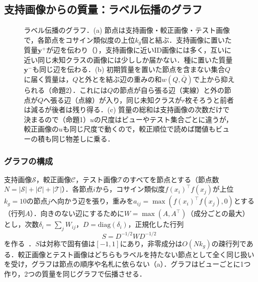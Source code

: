 \subsection{支持画像からの質量：ラベル伝播のグラフ}
\label{sec:graph}
\begin{figure}[t]
\centering
\scalebox{0.77}{}
\caption{ラベル伝播のグラフ．(a) 節点は支持画像・較正画像・テスト画像で，各節点をコサイン類似度の上位$k_g$個と結ぶ．支持画像に置いた質量$\mathbf{y}^{+}$が辺を伝わり（），支持画像に近いID画像には多く，互いに近い同じ未知クラスの画像には少ししか届かない．種に置いた質量$\mathbf{y}^{-}$も同じ辺を伝わる．(b) 初期質量を置いた節点を含まない集合$Q$に届く質量は，$Q$と外とを結ぶ辺の重みの和$w(Q,\bar{Q})$で上から抑えられる（命題2）．これには$Q$の節点が自ら張る辺（実線）と外の節点が$Q$へ張る辺（点線）が入り，同じ未知クラスが$r$枚そろうと前者は減るが後者は残り得る．(c) 質量の総和は支持画像の次数だけで決まるので（命題1）$u$の尺度はビューやテスト集合ごとに違うが，較正画像の$u$も同じ尺度で動くので，較正順位で読めば閾値もビューの積も同じ物差しに乗る．}
\label{fig:graph}
\end{figure}
\subsubsection{グラフの構成}
支持画像$\mathcal{S}$，較正画像$\mathcal{C}$，テスト画像$\mathcal{T}$のすべてを節点とする（節点数$N=|\mathcal{S}|+|\mathcal{C}|+|\mathcal{T}|$）．各節点$i$から，コサイン類似度$f(x_i)^{\top}f(x_j)$が上位$k_g{=}10$の節点$j$へ向かう辺を張り，重みを$a_{ij}=\max(f(x_i)^{\top}f(x_j),0)$とする（行列$A$）．向きのない辺にするために$W=\max(A,A^{\top})$（成分ごとの最大）とし，次数$\delta_i=\sum_jW_{ij}$，$D=\mathrm{diag}(\delta_i)$，正規化した行列
\begin{equation}
S=D^{-1/2}WD^{-1/2}
\label{eq:S}
\end{equation}
を作る~\cite{zhou2004lgc}．$S$は対称で固有値は$[-1,1]$にあり，非零成分は$O(Nk_g)$の疎行列である．較正画像とテスト画像はどちらもラベルを持たない節点として全く同じ扱いを受け，グラフは節点の順序や名札に依らない（a）．グラフはビューごとに1つ作り，2つの質量を同じグラフで伝播させる．

